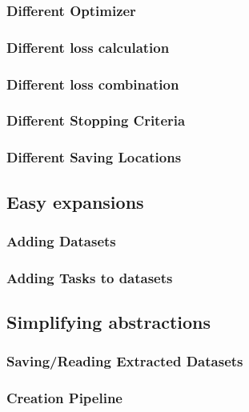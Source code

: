 \subsubsection{Different Optimizer}

\subsubsection{Different loss calculation}

\subsubsection{Different loss combination}

\subsubsection{Different Stopping Criteria}

\subsubsection{Different Saving Locations}

\subsection{Easy expansions}

\subsubsection{Adding Datasets}

\subsubsection{Adding Tasks to datasets}

\subsection{Simplifying abstractions}

\subsubsection{Saving/Reading Extracted Datasets}

\subsubsection{Creation Pipeline}

